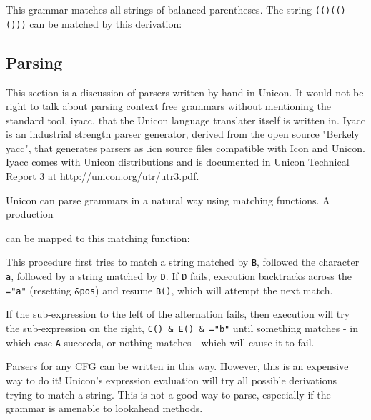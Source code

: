 This grammar matches all strings of balanced parentheses. The string
\texttt{(()(()()))} can be matched by this derivation:


\subsection*{Parsing}

This section is a discussion of parsers written by hand in Unicon.
It would not be right to talk about parsing context free grammars
without mentioning the standard tool, iyacc, that the Unicon language
translater itself is written in.  Iyacc is an industrial strength
parser generator, derived from the open source "Berkely yacc", that
generates parsers as .icn source files compatible with Icon and Unicon.
Iyacc comes with Unicon distributions and is documented in Unicon Technical
Report 3 at http://unicon.org/utr/utr3.pdf.

Unicon can parse grammars in a natural way using matching
functions. A production


\noindent
can be mapped to this matching function:


\noindent
This procedure first tries to match a string matched by \texttt{B},
followed the character \texttt{a}, followed by a string matched by
\texttt{D}. If \texttt{D} fails, execution
backtracks across the \texttt{="a"}
(resetting \texttt{\&pos}) and resume \texttt{B()}, which will attempt
the next match.

If the sub-expression to the left of the alternation fails, then execution will try the
sub-expression on the right, \texttt{C() \& E() \&
="b"} until something matches - in which
case \texttt{A} succeeds, or nothing matches - which will cause it to
fail.

Parsers for any CFG can be written in this way. However, this is an
expensive way to do it! Unicon's
expression evaluation will try all possible derivations
trying to match a string. This is not a good way to parse, especially
if the grammar is amenable to lookahead methods.

